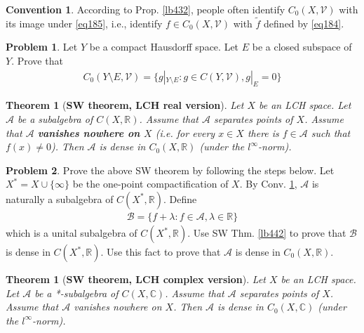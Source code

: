 \documentclass[12pt,b5paper,notitlepage]{article}
\theoremstyle{definition}
\newtheorem{cv}[df]{Convention}
\newtheorem{prob}{\color{red}Problem}[section]
\theoremstyle{plain}
\newtheorem{thm}[df]{Theorem}
\newcommand{\mc}{\mathcal}
\newcommand{\wtd}{\widetilde}
\newcommand{\scr}{\mathscr}
\newcommand{\Cbb}{\mathbb C}
\newcommand{\Rbb}{\mathbb R}
\numberwithin{equation}{section}
\begin{document}
\begin{cv}\label{lb449}
According to Prop. \ref{lb432}, people often identify $C_0(X,\mc V)$ with its image under \eqref{eq185}, i.e., identify $f\in C_0(X,\mc V)$ with $\wtd f$ defined by \eqref{eq184}.
\end{cv}








\begin{prob}
Let $Y$ be a compact Hausdorff space. Let $E$ be a closed subspace of $Y$. Prove that 
\begin{align*}
C_0(Y\setminus E,\mc V)=\{g|_{Y\setminus E}:g\in C(Y,\mc V),g|_E=0\}
\end{align*}
\end{prob}



\begin{thm}[\textbf{SW theorem, LCH real version}]
Let $X$ be an LCH space. Let $\scr A$ be a subalgebra of $C(X,\Rbb)$. Assume that $\scr A$ separates points of $X$. Assume that $\scr A$ \textbf{vanishes nowhere on $X$}  (i.e. for every $x\in X$ there is $f\in\scr A$ such that $f(x)\neq0$). Then $\scr A$ is dense in $C_0(X,\Rbb)$ (under the $l^\infty$-norm).
\end{thm}

\begin{prob}
Prove the above SW theorem by following the steps below. Let $X^*=X\cup\{\infty\}$ be the one-point compactification of $X$. By Conv. \ref{lb449}, $\scr A$ is naturally a subalgebra of $C(X^*,\Rbb)$. Define
\begin{align*}
\scr B=\{f+\lambda:f\in\scr A,\lambda\in\Rbb\}
\end{align*}
which is a unital subalgebra of $C(X^*,\Rbb)$. Use SW Thm. \ref{lb442} to prove that $\scr B$ is dense in $C(X^*,\Rbb)$. Use this fact to prove that $\scr A$ is dense in $C_0(X,\Rbb)$.
\end{prob}



\begin{thm}[\textbf{SW theorem, LCH complex version}]
Let $X$ be an LCH space. Let $\scr A$ be a *-subalgebra of $C(X,\Cbb)$. Assume that $\scr A$ separates points of $X$. Assume that $\scr A$ vanishes nowhere on $X$. Then $\scr A$ is dense in $C_0(X,\Cbb)$ (under the $l^\infty$-norm).
\end{thm}
\end{document}
